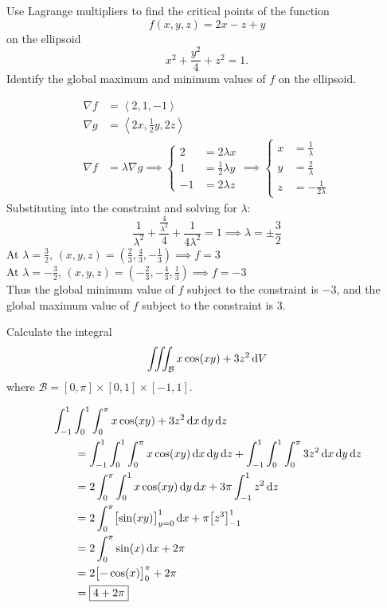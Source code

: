 \documentclass[12pt,answers]{exam}
\newcommand{\vect}[1]{\left\langle #1\right\rangle}
\begin{document}
\begin{questions}
\newpage
\question[15]
Use Lagrange multipliers to find the critical points of the function 
\[f(x, y, z) = 2x - z + y\]
on the ellipsoid 
\[x^2 + \frac{y^2}{4} + z^2 = 1.\]
Identify the global maximum and minimum values of $f$ on the ellipsoid.
\begin{solution}
\begin{align*}
    \nabla f &= \vect{2, 1, -1} \\ 
    \nabla g &= \vect{2x, \frac12 y, 2z} \\ 
    \nabla f &= \lambda \nabla g \implies 
    \left\{ 
        \begin{aligned}
            2 &= 2\lambda x \\ 
            1 &= \frac12 \lambda y \\ 
            -1 &= 2 \lambda z
        \end{aligned}
    \right.
    \implies 
    \left\{
    \begin{aligned}
        x &= \frac 1 \lambda \\ 
        y &= \frac 2\lambda \\ 
        z &= -\frac{1}{2\lambda}
    \end{aligned}
    \right.
\end{align*}
Substituting into the constraint and solving for $\lambda$:
\[
    \frac{1}{\lambda^2} + \frac{\frac{4}{\lambda^2}}{4} + \frac{1}{4\lambda^2} = 1 \implies \lambda = \pm \frac 32
\]
At $\lambda = \frac 32$, $(x, y, z) = (\frac23, \frac 43, -\frac13) \implies f = 3$ \\
At $\lambda = - \frac 32$, $(x, y, z) = (-\frac23, -\frac 43, \frac13) \implies f = -3$ \\

Thus the global minimum value of $f$ subject to the constraint is $-3$, and the global maximum value of $f$ subject to the constraint is 3.

\end{solution}

\newpage
\question[15]
Calculate the integral 
\[\iiint_{\mathcal{B}} x \cos(xy) + 3z^2 \dif V\]
where $\mathcal{B} = [0,\pi] \times [0,1] \times [-1,1]$.
\begin{solution}
\begin{align*}
    \MoveEqLeft \int_{-1}^1 \int_0^1 \int_0^\pi x \cos(xy) + 3z^2 \dif x \dif y \dif z \\ 
    &= \int_{-1}^1 \int_0^1 \int_0^\pi x \cos(xy) \dif x \dif y \dif z + \int_{-1}^1 \int_0^1 \int_0^\pi 3z^2 \dif x \dif y \dif z \\ 
    &= 2 \int_0^\pi \int_0^1 x \cos(xy) \dif y \dif x + 3\pi \int_{-1}^1 z^2 \dif z \\ 
    &= 2 \int_0^\pi \bigl[\sin(xy)\bigr]_{y=0}^1 \dif x + \pi \bigl[z^3\bigr]_{-1}^1 \\ 
    &= 2 \int_0^\pi \sin(x) \dif x + 2\pi \\ 
    &= 2 \bigl[-\cos(x)\bigr]_0^\pi + 2\pi \\ 
    &= \boxed{4 + 2\pi}
\end{align*}
\end{solution}


\end{questions}
\end{document}
